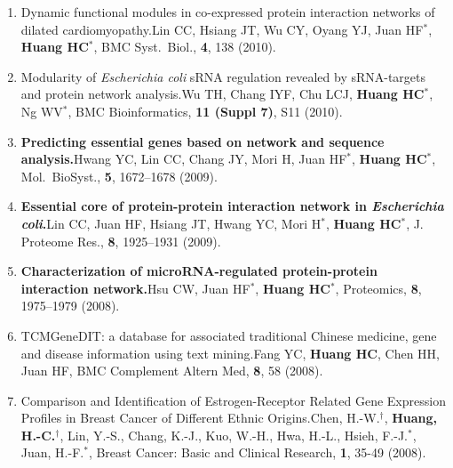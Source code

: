 \documentclass[10pt,a4paper]{article}
\def\mypub#1#2#3{{#1.}\newline #2, #3.}
\def\mybpub#1#2#3{{\boldmath \bf #1.}\newline #2, #3.}
\def\cited#1{Cited $\ge$ #1}
\def\impf#1#2{\def\tempa{}\def\tempb{#2}\ifx\tempa\tempb%
IF: #1%
\else
IF: #1, #2\%%
\fi
}
\def\iproteomics{\impf{4.586}{12.31}}
\def\ijpr{\impf{5.684}{}} %
\def\imbs{\impf{4.12}{}}
\begin{document}
\begin{enumerate}
\item
\mypub{Dynamic functional modules in co-expressed protein interaction networks of dilated cardiomyopathy}
{Lin CC, Hsiang JT, Wu CY, Oyang YJ, Juan HF$^{*}$, {\bf Huang HC$^{*}$}}
{BMC Syst.\ Biol., {\bf 4}, 138 (2010)}

\item
\mypub{Modularity of \textsl{Escherichia coli} sRNA regulation revealed by sRNA-targets and protein network analysis}
{Wu TH, Chang IYF, Chu LCJ, {\bf Huang HC$^{*}$}, Ng WV$^{*}$}
{BMC Bioinformatics, {\bf 11 (Suppl 7)}, S11 (2010)}

\item
\mybpub{Predicting essential genes based on network and sequence analysis}
{Hwang YC, Lin CC, Chang JY, Mori H, Juan HF$^{*}$, {\bf Huang HC$^{*}$}}
{Mol.\ BioSyst., {\bf 5}, 1672--1678 (2009)}

\item
\mybpub{Essential core of protein-protein interaction network in \textsl{Escherichia coli}}
{Lin CC, Juan HF, Hsiang JT, Hwang YC, Mori H$^{*}$, {\bf Huang HC$^{*}$}}
{J. Proteome Res., {\bf 8}, 1925--1931 (2009)}

\item
\mybpub{Characterization of microRNA-regulated protein-protein interaction network}
{Hsu CW, Juan HF$^{*}$, {\bf Huang HC$^*$}}
{Proteomics, {\bf 8}, 1975--1979 (2008)}


\item
\mypub{TCMGeneDIT: a database for associated traditional Chinese medicine, gene and disease information using text mining}
{Fang YC, {\bf Huang HC}, Chen HH, Juan HF}
{BMC Complement Altern Med, {\bf 8}, 58 (2008)}

\item
\mypub{Comparison and Identification of Estrogen-Receptor Related Gene Expression Profiles in Breast Cancer of Different Ethnic Origins}
{Chen, H.-W.$^{\dagger}$, {\bf Huang, H.-C.$^{\dagger}$}, Lin, Y.-S., Chang, K.-J., Kuo, W.-H., Hwa, H.-L., Hsieh, F.-J.$^{*}$, Juan, H.-F.$^{*}$}
{Breast Cancer: Basic and Clinical Research, {\bf 1}, 35-49 (2008)}


\end{enumerate}
\end{document}
